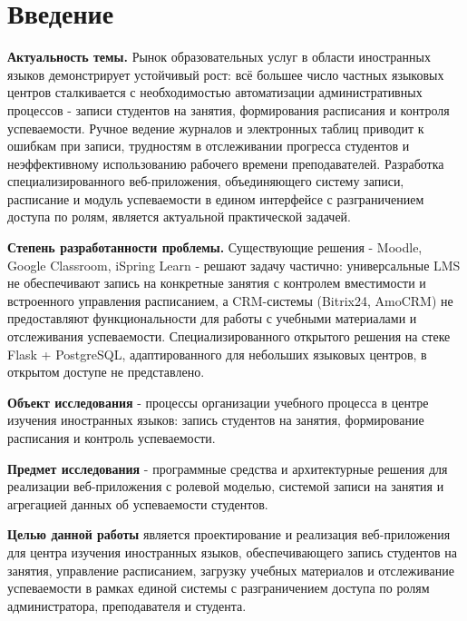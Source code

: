 \section*{Введение}

\textbf{Актуальность темы.} Рынок образовательных услуг в области иностранных
языков демонстрирует устойчивый рост: всё большее число частных языковых центров
сталкивается с необходимостью автоматизации административных процессов - записи
студентов на занятия, формирования расписания и контроля успеваемости. Ручное
ведение журналов и электронных таблиц приводит к ошибкам при записи, трудностям
в отслеживании прогресса студентов и неэффективному использованию рабочего времени
преподавателей. Разработка специализированного веб-приложения, объединяющего
систему записи, расписание и модуль успеваемости в едином интерфейсе с разграничением
доступа по ролям, является актуальной практической задачей.

\textbf{Степень разработанности проблемы.} Существующие решения - Moodle,
Google Classroom, iSpring Learn - решают задачу частично: универсальные LMS
не обеспечивают запись на конкретные занятия с контролем вместимости и встроенного
управления расписанием, а CRM-системы (Bitrix24, AmoCRM) не предоставляют
функциональности для работы с учебными материалами и отслеживания успеваемости.
Специализированного открытого решения на стеке Flask + PostgreSQL, адаптированного
для небольших языковых центров, в открытом доступе не представлено.

\textbf{Объект исследования} - процессы организации учебного процесса в центре
изучения иностранных языков: запись студентов на занятия, формирование расписания
и контроль успеваемости.

\textbf{Предмет исследования} - программные средства и архитектурные решения
для реализации веб-приложения с ролевой моделью, системой записи на занятия
и агрегацией данных об успеваемости студентов.

\textbf{Целью данной работы} является проектирование и реализация веб-приложения
для центра изучения иностранных языков, обеспечивающего запись студентов на занятия,
управление расписанием, загрузку учебных материалов и отслеживание успеваемости
в рамках единой системы с разграничением доступа по ролям администратора,
преподавателя и студента.
